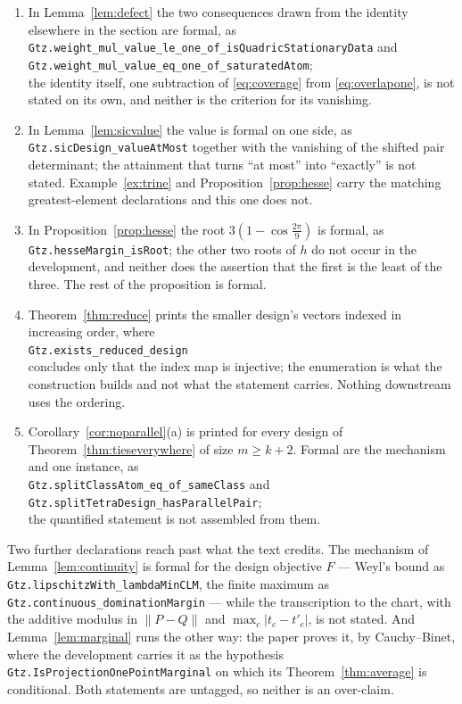 \begin{enumerate}
  the proof of Proposition~\ref{prop:e2}, whose printed argument consumes it,
  as does \eqref{eq:count}.
\item[\rm(v)] In Lemma~\ref{lem:defect} the two consequences drawn from the
  identity elsewhere in the section are formal, as\\
  \texttt{Gtz.weight\_mul\_value\_le\_one\_of\_isQuadricStationaryData} and\\
  \texttt{Gtz.weight\_mul\_value\_eq\_one\_of\_saturatedAtom};\\
  the identity itself, one subtraction of \eqref{eq:coverage} from
  \eqref{eq:overlapone}, is not stated on its own, and neither is the
  criterion for its vanishing.
\item[\rm(vi)] In Lemma~\ref{lem:sicvalue} the value is formal on one side,
  as \texttt{Gtz.sicDesign\_valueAtMost} together with the vanishing of the
  shifted pair determinant; the attainment that turns ``at most'' into
  ``exactly'' is not stated.  Example~\ref{ex:trine} and
  Proposition~\ref{prop:hesse} carry the matching greatest-element
  declarations and this one does not.
\item[\rm(vii)] In Proposition~\ref{prop:hesse} the root
  $3(1-\cos\tfrac{2\pi}9)$ is formal, as \texttt{Gtz.hesseMargin\_isRoot};
  the other two roots of $h$ do not occur in the development, and neither
  does the assertion that the first is the least of the three.  The rest of
  the proposition is formal.
\item[\rm(viii)] Theorem~\ref{thm:reduce} prints the smaller design's vectors
  indexed in increasing order, where\\
  \texttt{Gtz.exists\_reduced\_design}\\
  concludes only that the index map is injective; the enumeration is what the
  construction builds and not what the statement carries.  Nothing downstream
  uses the ordering.
\item[\rm(ix)] Corollary~\ref{cor:noparallel}(a) is printed for every design
  of Theorem~\ref{thm:tieseverywhere} of size $m\ge k+2$.  Formal are the
  mechanism and one instance, as\\
  \texttt{Gtz.splitClassAtom\_eq\_of\_sameClass} and\\
  \texttt{Gtz.splitTetraDesign\_hasParallelPair};\\
  the quantified statement is not assembled from them.
\end{enumerate}

Two further declarations reach past what the text credits.  The mechanism of
Lemma~\ref{lem:continuity} is formal for the design objective $F$ --- Weyl's
bound as \texttt{Gtz.lipschitzWith\_lambdaMinCLM}, the finite maximum as
\texttt{Gtz.continuous\_dominationMargin} --- while the transcription to the
chart, with the additive modulus in $\lVert P-Q\rVert$ and
$\max_c\lvert t_c-t'_c\rvert$, is not stated.  And
Lemma~\ref{lem:marginal} runs the other way: the paper proves it, by
Cauchy--Binet, where the development carries it as the hypothesis
\texttt{Gtz.IsProjectionOnePointMarginal} on which its
Theorem~\ref{thm:average} is conditional.  Both statements are untagged, so
neither is an over-claim.
